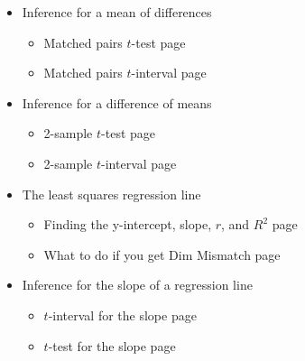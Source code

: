 \begin{itemize}
\item[] Inference for a mean of differences
\begin{itemize}\vspace{-1mm}
\setlength{\itemsep}{0mm}
\item[] Matched pairs $t$-test \hfill page~\pageref{matchedpairsttest}
\item[] Matched pairs $t$-interval  \hfill page~\pageref{matchedpairstint}
\end{itemize}


\item[] Inference for a difference of means 
\begin{itemize}\vspace{-1mm}
\setlength{\itemsep}{0mm}
\item[] 2-sample $t$-test  \hfill page~\pageref{2SampTtest}
\item[] 2-sample $t$-interval \hfill page~\pageref{2SampTint}
\end{itemize}


\item[] The least squares regression line
\begin{itemize}\vspace{-1mm}
\setlength{\itemsep}{0mm}
\item[] Finding the y-intercept, slope, $r$, and $R^2$ \hfill page~\pageref{calclinreg}
\item[] What to do if you get Dim Mismatch \hfill page~\pageref{dimmismatch}
\end{itemize}


\item[] Inference for the slope of a regression line
\begin{itemize}\vspace{-1mm}
\setlength{\itemsep}{0mm}
\item[] $t$-interval for the slope \hfill page~\pageref{LinRegint}
\item[] $t$-test for the slope  \hfill page~\pageref{LinRegtest}
\end{itemize}



\end{itemize}

